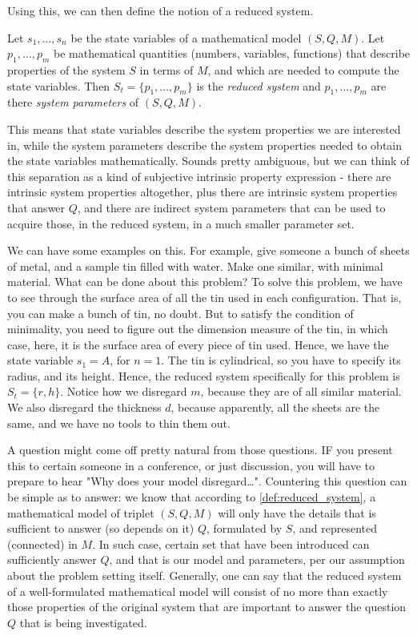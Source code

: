 Using this, we can then define the notion of a reduced system. 
\begin{definition} \label{def:reduced_system}
    Let $s_{1},\dots,s_{n}$ be the state variables of a mathematical model $(S,Q,M)$. Let $p_{1},\dots,p_{m}$ be mathematical quantities (numbers, variables, functions) that describe properties of the system $S$ in terms of $M$, and which are needed to compute the state variables. Then $S_{t}=\{p_{1},\dots,p_{m}\}$ is the \textit{reduced system} and $p_{1},\dots,p_{m}$ are there \textit{system parameters} of $(S,Q,M)$. 
\end{definition}

This means that state variables describe the system properties we are interested in, while the system parameters describe the system properties needed to obtain the state variables mathematically. Sounds pretty ambiguous, but we can think of this separation as a kind of subjective intrinsic property expression - there are intrinsic system properties altogether, plus there are intrinsic system properties that answer $Q$, and there are indirect system parameters that can be used to acquire those, in the reduced system, in a much smaller parameter set. 

We can have some examples on this. For example, give someone a bunch of sheets of metal, and a sample tin filled with water. Make one similar, with minimal material. What can be done about this problem? To solve this problem, we have to see through the surface area of all the tin used in each configuration. That is, you can make a bunch of tin, no doubt. But to satisfy the condition of minimality, you need to figure out the dimension measure of the tin, in which case, here, it is the surface area of every piece of tin used. Hence, we have the state variable $s_{1}=A$, for $n=1$. The tin is cylindrical, so you have to specify its radius, and its height. Hence, the reduced system specifically for this problem is $S_{t}=\{r,h\}$. Notice how we disregard $m$, because they are of all similar material. We also disregard the thickness $d$, because apparently, all the sheets are the same, and we have no tools to thin them out. 

A question might come off pretty natural from those questions. IF you present this to certain someone in a conference, or just discussion, you will have to prepare to hear "Why does your model disregard\dots". Countering this question can be simple as to answer: we know that according to \ref{def:reduced_system}, a mathematical model of triplet $(S,Q,M)$ will only have the details that is sufficient to answer (so depends on it) $Q$, formulated by $S$, and represented (connected) in $M$. In such case, certain set that have been introduced can sufficiently answer $Q$, and that is our model and parameters, per our assumption about the problem setting itself. Generally, one can say that the reduced system of a well-formulated mathematical model will consist of no more than exactly those properties of the original system that are important to answer the question $Q$ that is being investigated. 
\vspace{2mm}

